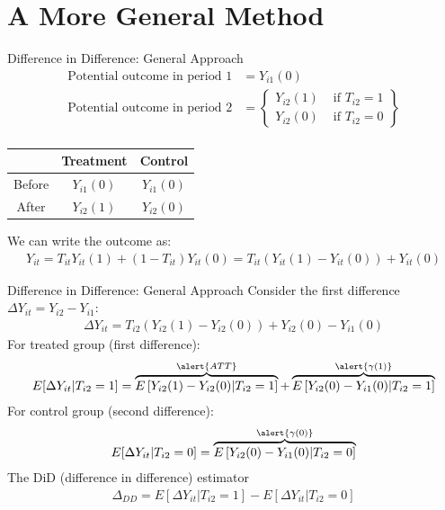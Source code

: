 \documentclass[xcolor=pdftex,dvipsnames,table,mathserif,aspectratio=169]{beamer}
\begin{document}
\section{A More General Method}
\begin{frame}{Difference in Difference: General Approach}
\begin{align*}
\text{Potential outcome in period } 1&=Y_{i 1}(0)\\
\text{Potential outcome in period } 2&=\left\{ \begin{array}{ll}Y_{i 2}(1) & \text { if } T_{i 2}=1 \\ Y_{i 2}(0) & \text { if } T_{i 2}=0\end{array}\right\}\\
\end{align*}
\begin{center}
\begin{tabular}{|c|c|c|}
\hline & Treatment & Control \\
\hline Before & $Y_{i 1}(0)$ & $Y_{i 1}(0)$ \\
After & $Y_{i 2}(1)$ & $Y_{i 2}(0)$ \\
\hline
\end{tabular}
\end{center}
We can write the outcome as:
\begin{align*}
Y_{i t}=T_{i t} Y_{i t}(1)+\left(1-T_{i t}\right) Y_{i t}(0)=T_{i t}\left(Y_{i t}(1)-Y_{i t}(0) \right)+Y_{i t}(0)
\end{align*}
\end{frame}

\begin{frame}{Difference in Difference: General Approach}
\small
Consider the first difference $\Delta Y_{it} = Y_{i2} - Y_{i1}$:
\begin{align*}
\Delta Y_{it}  = T_{i2} \left(Y_{i2}(1) - Y_{i2}(0) \right) +  Y_{i2}(0) - Y_{i1}(0)
\end{align*}
For treated group (first difference):
\begin{align*}
E[\Delta Y_{it} | T_{i2}=1]  = \overbrace{E\left[Y_{i2}(1) - Y_{i2}(0) | T_{i2}=1 \right]}^{\alert{ATT}} +  \overbrace{E\left[Y_{i2}(0) - Y_{i1}(0) | T_{i2}=1 \right]}^{\alert{\gamma(1)}}
\end{align*}
For control group (second difference):
\begin{align*}
E[\Delta Y_{it} | T_{i2}=0]  = \overbrace{E\left[Y_{i2}(0) - Y_{i1}(0) | T_{i2}=0 \right]}^{\alert{\gamma(0)}}
\end{align*}
The DiD (difference in difference) estimator
\begin{align*}
\Delta_{DD} = E[\Delta Y_{it} | T_{i2}=1]  - E[\Delta Y_{it} | T_{i2}=0]  
\end{align*}
\end{frame}
\end{document}
